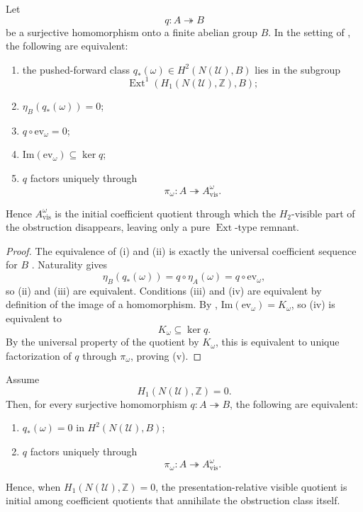 \begin{proposition}\label{thm:intrinsic-pure-ext-initiality}
Let
\[
q:A\twoheadrightarrow B
\]
be a surjective homomorphism onto a finite abelian group $B$. In the setting of , the following are equivalent:
\begin{enumerate}[label=(\roman*),nosep]
\item the pushed-forward class $q_*(\omega)\in H^2(N(\mathcal U),B)$ lies in the subgroup
\[
\operatorname{Ext}^1(H_1(N(\mathcal U),\mathbb Z),B);
\]
\item $\eta_B(q_*(\omega))=0$;
\item $q\circ \mathrm{ev}_{\omega}=0$;
\item $\mathrm{Im}(\mathrm{ev}_{\omega})\subseteq \ker q$;
\item $q$ factors uniquely through
\[
\pi_{\omega}:A\twoheadrightarrow A_{\mathrm{vis}}^{\omega}.
\]
\end{enumerate}
Hence $A_{\mathrm{vis}}^{\omega}$ is the initial coefficient quotient through which the $H_2$-visible part of the obstruction disappears, leaving only a pure $\operatorname{Ext}$-type remnant.
\end{proposition}

\begin{proof}
The equivalence of \textup{(i)} and \textup{(ii)} is exactly the universal coefficient sequence for $B$ \cite[Sec.~3.1]{Hatcher2002}. Naturality gives
\[
\eta_B(q_*(\omega))=q\circ \eta_A(\omega)=q\circ \mathrm{ev}_{\omega},
\]
so \textup{(ii)} and \textup{(iii)} are equivalent. Conditions \textup{(iii)} and \textup{(iv)} are equivalent by definition of the image of a homomorphism. By , $\mathrm{Im}(\mathrm{ev}_{\omega})=K_{\omega}$, so \textup{(iv)} is equivalent to
\[
K_{\omega}\subseteq \ker q.
\]
By the universal property of the quotient by $K_{\omega}$, this is equivalent to unique factorization of $q$ through $\pi_{\omega}$, proving \textup{(v)}.
\end{proof}

\begin{corollary}\label{cor:h1-vanishing-class-trivializing}
Assume
\[
H_1(N(\mathcal U),\mathbb Z)=0.
\]
Then, for every surjective homomorphism $q:A\twoheadrightarrow B$, the following are equivalent:
\begin{enumerate}[label=(\roman*),nosep]
\item $q_*(\omega)=0$ in $H^2(N(\mathcal U),B)$;
\item $q$ factors uniquely through
\[
\pi_{\omega}:A\twoheadrightarrow A_{\mathrm{vis}}^{\omega}.
\]
\end{enumerate}
Hence, when $H_1(N(\mathcal U),\mathbb Z)=0$, the presentation-relative visible quotient is initial among coefficient quotients that annihilate the obstruction class itself.
\end{corollary}

